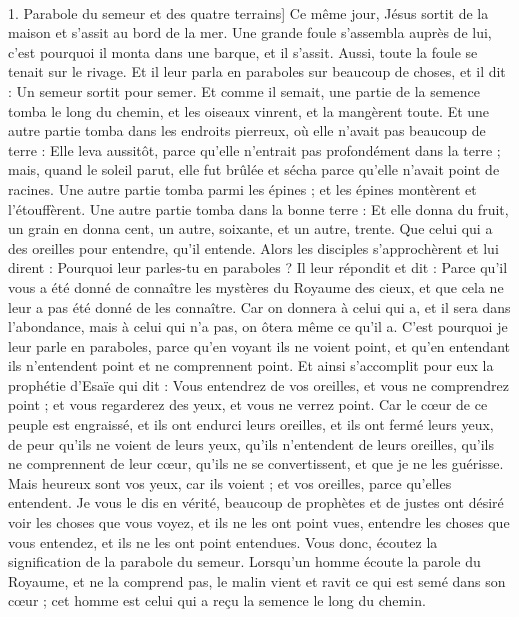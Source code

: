 \begin{multicols}{2}
{\\1. Parabole du semeur et des quatre terrains]}
\VerseOne{}Ce même jour, Jésus sortit de la maison et s'assit au bord de la mer.
Une grande foule s'assembla auprès de lui, c’est pourquoi il monta dans une barque, et il s'assit. Aussi, toute la foule se tenait sur le rivage.
Et il leur parla en paraboles sur beaucoup de choses, et il dit : Un semeur sortit pour semer.
Et comme il semait, une partie de la semence tomba le long du chemin, et les oiseaux vinrent, et la mangèrent toute.
Et une autre partie tomba dans les endroits pierreux, où elle n'avait pas beaucoup de terre : Elle leva aussitôt, parce qu'elle n'entrait pas profondément dans la terre ;
mais, quand le soleil parut, elle fut brûlée et sécha parce qu'elle n'avait point de racines.
Une autre partie tomba parmi les épines ; et les épines montèrent et l'étouffèrent.
Une autre partie tomba dans la bonne terre : Et elle donna du fruit, un grain en donna cent, un autre, soixante, et un autre, trente.
Que celui qui a des oreilles pour entendre, qu'il entende.
Alors les disciples s'approchèrent et lui dirent : Pourquoi leur parles-tu en paraboles ?
Il leur répondit et dit : Parce qu'il vous a été donné de connaître les mystères du Royaume des cieux, et que cela ne leur a pas été donné de les connaître.
Car on donnera à celui qui a, et il sera dans l’abondance, mais à celui qui n'a pas, on ôtera même ce qu’il a.
C'est pourquoi je leur parle en paraboles, parce qu'en voyant ils ne voient point, et qu'en entendant ils n'entendent point et ne comprennent point.
Et ainsi s'accomplit pour eux la prophétie d'Esaïe qui dit : Vous entendrez de vos oreilles, et vous ne comprendrez point ; et vous regarderez des yeux, et vous ne verrez point.
Car le cœur de ce peuple est engraissé, et ils ont endurci leurs oreilles, et ils ont fermé leurs yeux, de peur qu'ils ne voient de leurs yeux, qu'ils n'entendent de leurs oreilles, qu'ils ne comprennent de leur cœur, qu’ils ne se convertissent, et que je ne les guérisse{}.
Mais heureux sont vos yeux, car ils voient ; et vos oreilles, parce qu’elles entendent.
Je vous le dis en vérité, beaucoup de prophètes et de justes ont désiré voir les choses que vous voyez, et ils ne les ont point vues, entendre les choses que vous entendez, et ils ne les ont point entendues.
Vous donc, écoutez la signification de la parabole du semeur.
Lorsqu’un homme écoute la parole du Royaume, et ne la comprend pas, le malin vient et ravit ce qui est semé dans son cœur ; cet homme est celui qui a reçu la semence le long du chemin.

\end{multicols}
